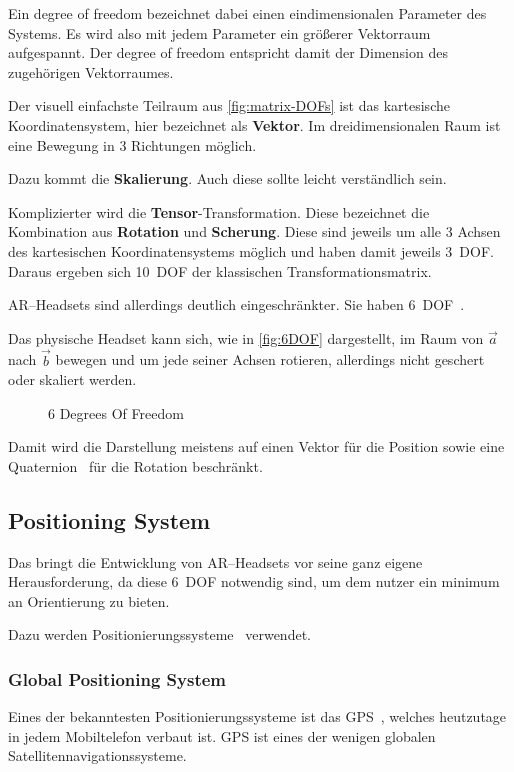     Ein degree of freedom bezeichnet dabei einen eindimensionalen Parameter des Systems.
    Es wird also mit jedem Parameter ein größerer Vektorraum aufgespannt.
    Der degree of freedom entspricht damit der Dimension des zugehörigen Vektorraumes.

    Der visuell einfachste Teilraum aus \autoref{fig:matrix-DOFs} ist das kartesische Koordinatensystem, hier bezeichnet als \textbf{Vektor}.
    Im dreidimensionalen Raum ist eine Bewegung in 3 Richtungen möglich.

    Dazu kommt die \textbf{Skalierung}.
    Auch diese sollte leicht verständlich sein.

    Komplizierter wird die \textbf{Tensor}-Transformation.
    Diese bezeichnet die Kombination aus \textbf{Rotation} und \textbf{Scherung}.
    Diese sind jeweils um alle 3 Achsen des kartesischen Koordinatensystems möglich und haben damit jeweils 3~DOF\@.
    Daraus ergeben sich 10~DOF der klassischen Transformationsmatrix.

    AR--Headsets sind allerdings deutlich eingeschränkter.
    Sie haben 6~DOF~\autocite{wikipedia-contributors-2023B}.

    Das physische Headset kann sich, wie in \autoref{fig:6DOF} dargestellt, im Raum von $\vec{a}$ nach $\vec{b}$ bewegen und um jede seiner Achsen rotieren, allerdings nicht geschert oder skaliert werden.

    \begin{figure}[ht!]
        \center
        
        \caption{6 Degrees Of Freedom~\autocite{wikipedia-contributors-2023B}}
        \label{fig:6DOF}
    \end{figure}

    Damit wird die Darstellung meistens auf einen Vektor für die Position sowie eine Quaternion~\autocite{wikipedia-contributors-2023G} für die Rotation beschränkt.

\subsection{Positioning System}\label{subsec:positioning-system}
    Das bringt die Entwicklung von AR--Headsets vor seine ganz eigene Herausforderung, da diese 6~DOF notwendig sind, um dem nutzer ein minimum an Orientierung zu bieten.

    Dazu werden Positionierungssysteme~\autocite{wikipedia-contributors-2023A} verwendet.

    \subsubsection{Global Positioning System}\label{subsubsec:global-positioning-system}
        Eines der bekanntesten Positionierungssysteme ist das GPS~\autocite{wikipedia-contributors-2023J}, welches heutzutage in jedem Mobiltelefon verbaut ist.
        GPS ist eines der wenigen globalen Satellitennavigationssysteme.

